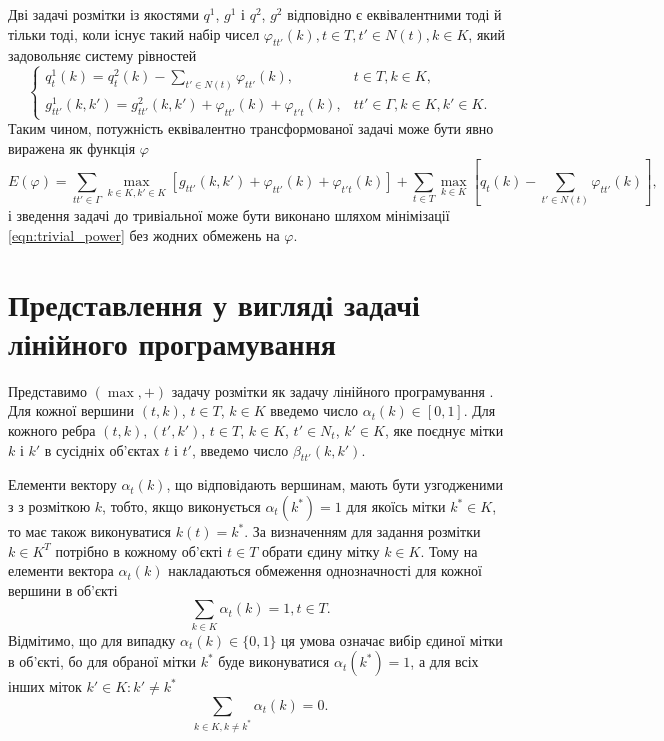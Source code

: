 Дві задачі розмітки із якостями $q^1$, $g^1$ і $q^2$, $g^2$ відповідно
є еквівалентними тоді й тільки тоді, коли існує такий набір чисел
$\varphi_{tt'}(k), t\in T, t'\in N(t), k\in K$, який задовольняє систему рівностей
\begin{equation*}
    \begin{cases}
      q^1_t(k) = q^2_t(k) - \sum\limits_{t'\in N(t)} \varphi_{tt'}(k), & t\in T, k\in K,\\
      g^1_{tt'}(k,k') = g^2_{tt'}(k,k') + \varphi_{tt'}(k) + \varphi_{t't}(k), &
        tt'\in\Gamma, k\in K, k'\in K.
    \end{cases}
  \end{equation*}
Таким чином, потужність еквівалентно трансформованої задачі може бути
явно виражена як функція $\varphi$
\begin{equation}
    \label{eqn:trivial_power}
    E(\varphi) = \sum\limits_{tt'\in\Gamma}\max\limits_{k\in K, k'\in K}[ g_{tt'}(k,k')
    + \varphi_{tt'}(k) + \varphi_{t't}(k)] +
    \sum\limits_{t\in T}\max\limits_{k\in K}[ q_t(k) - \sum\limits_{t'\in N(t)} \varphi_{tt'}(k)],
   \end{equation}
і зведення задачі до тривіальної може бути виконано шляхом мінімізації \eqref{eqn:trivial_power}
без жодних обмежень на $\varphi$.

\section{Представлення у вигляді задачі лінійного програмування}

Представимо $(\max,+)$ задачу розмітки як задачу
лінійного програмування \cite{Werner:2010, savchynskyy}. Для кожної
вершини $(t,k)$, $t\in T$, $k\in K$ введемо число $\alpha_t(k)\in [0,1]$.
Для кожного ребра $(t,k),(t',k')$, $t\in T$, $k\in K$, $t'\in N_t$, $k'\in K$, яке поєднує мітки
$k$ і $k'$ в сусідніх об'єктах $t$ і $t'$, введемо число $\beta_{tt'}(k,k')$.

Елементи вектору $\alpha_t(k)$, що відповідають вершинам, мають бути узгодженими з
з розміткою $k$, тобто, якщо виконується $\alpha_t(k^*)=1$ для якоїсь мітки
$k^*\in K$, то має також виконуватися $k(t)=k^*$. За визначенням для задання розмітки
$k\in K^T$ потрібно в кожному об'єкті $t\in T$ обрати єдину мітку $k\in K$.
Тому на елементи вектора $\alpha_t(k)$ накладаються обмеження однозначності для
кожної вершини в об'єкті
\begin{equation*}
   \sum\limits_{k \in K} \alpha_t(k)=1,  t\in T.
 \end{equation*}
Відмітимо, що для випадку $\alpha_t(k)\in \{0,1\}$ ця умова означає
вибір єдиної мітки в об'єкті, бо для обраної мітки $k^*$ буде виконуватися
$\alpha_t(k^*)=1$, а для всіх інших міток $k'\in K:k'\neq k^*$
\begin{equation*}
  \sum\limits_{k \in K, k\neq k^*} \alpha_t(k)=0.
\end{equation*}

